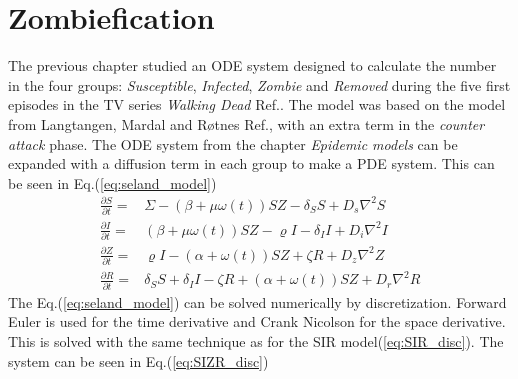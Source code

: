 \documentclass[%
twoside,                 %
final,                   %
chapterprefix=true,      %
open=right               %
10pt]{book}
\begin{document}
\section{Zombiefication}
The previous chapter studied an ODE system designed to calculate the number in the four groups: \emph{Susceptible}, \emph{Infected}, \emph{Zombie} and \emph{Removed} during the five first episodes in the TV series \emph{Walking Dead} Ref.\cite{walking_dead}. The model was based on the model from Langtangen, Mardal and Røtnes Ref.\cite{zombie-math}, with an extra term in the \emph{counter attack} phase. The ODE system from the chapter \emph{Epidemic models} can be expanded with a diffusion term in each group to make a PDE system. This can be seen in Eq.(\ref{eq:seland_model})  
\begin{equation} \label{eq:seland_model}
	\begin{aligned} 
	\frac{\partial S}{\partial t} =& \Sigma -(\beta+\mu \omega(t))SZ - \delta_SS +D_s\nabla^2 S \\
	\frac{\partial I}{\partial t} =& (\beta+\mu \omega(t))SZ - \varrho I - \delta_II+D_i\nabla^2 I\\
	\frac{\partial Z}{\partial t} =& \varrho I- (\alpha+\omega(t))SZ + \zeta R+D_z\nabla^2 Z\\
	\frac{\partial R}{\partial t} =& \delta_SS +\delta_II -\zeta R + (\alpha+\omega(t))SZ+D_r\nabla^2 R 
	\end{aligned}
\end{equation}
The Eq.(\ref{eq:seland_model}) can be solved numerically by discretization. Forward Euler is used for the time derivative and Crank Nicolson for the space derivative. This is solved with the same technique as for the SIR model(\ref{eq:SIR_disc}). The system can be seen in Eq.(\ref{eq:SIZR_disc})
\end{document}
